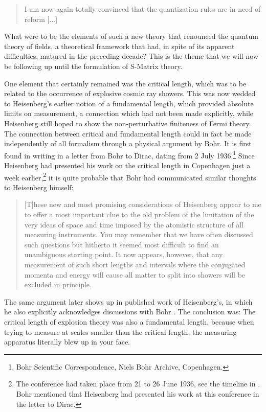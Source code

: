 \documentclass[12pt,a4paper]{article}
\begin{document}
\begin{quote}
I am now again totally convinced that the quantization rules are in need of reform [...]
\end{quote}

What were to be the elements of such a new theory that renounced the quantum theory of fields, a theoretical framework that had, in spite of its apparent difficulties, matured in the preceding decade? This is the theme that we will now be following up until the formulation of S-Matrix theory.

One element that certainly remained was the critical length, which was to be related to the occurrence of explosive cosmic ray showers. This was now wedded to Heisenberg's earlier notion of a fundamental length, which provided absolute limits on measurement, a connection which had not been made explicitly, while Heisenberg still hoped to show the non-perturbative finiteness of Fermi theory. The connection between critical and fundamental length could in fact be made independently of all formalism through a physical argument by Bohr. It is first found in writing in a letter from Bohr to Dirac, dating from 2 July 1936.\footnote{Bohr Scientific Correspondence, Niels Bohr Archive, Copenhagen.} Since Heisenberg had presented his work on the critical length in Copenhagen just a week earlier,\footnote{The conference had taken place from 21 to 26 June 1936, see the timeline in \citep{hermann_1985_wissenschaftlicher}. Bohr mentioned that Heisenberg had presented his work at this conference in the letter to Dirac.} it is quite probable that Bohr had communicated similar thoughts to Heisenberg himself:

\begin{quote}
[T]hese new and most promising considerations of Heisenberg appear to me to offer a most important clue to the old problem of the limitation of the very ideas of space and time imposed by the atomistic structure of all measuring instruments. You may remember that we have often discussed such questions but hitherto it seemed most difficult to find an unambiguous starting point. It now appears, however, that any measurement of such short lengths and intervals where the conjugated momenta and energy will cause all matter to split into showers will be excluded in principle.
\end{quote}

The same argument later shows up in published work of Heisenberg's, in which he also explicitly acknowledges discussions with Bohr \citep{heisenberg_1938_uber-die-in-der-theorie}. The conclusion was: The critical length of explosion theory was also a fundamental length, because when trying to measure at scales smaller than the critical length, the measuring apparatus literally blew up in your face.
\end{document}
